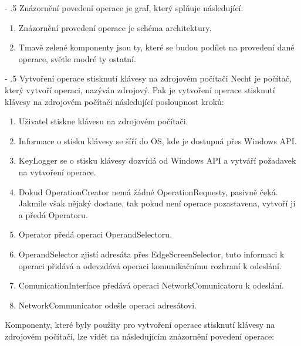 \documentclass[12pt]{article}
\makeatletter
\renewcommand\paragraph{%
    \@startsection{paragraph}{4}{0mm}%
       {-\baselineskip}%
       {.5\baselineskip}%
       {\normalfont\normalsize\bfseries}}
\makeatother
\begin{document}
\paragraph{Znázornění povedení operace}
je graf, který splňuje následující:
\begin{enumerate}[leftmargin=5mm]
\item Znázornění provedení operace je schéma architektury.
\item Tmavě zelené komponenty jsou ty, které se budou podílet na provedení dané operace, světle modré ty ostatní.
\end{enumerate}

\paragraph{Vytvoření operace stisknutí klávesy na zdrojovém počítači}
Nechť je počítač, který vytvoří operaci, nazýván zdrojový. Pak je vytvoření operace stisknutí klávesy na zdrojovém počítači následující posloupnost kroků:
\begin{enumerate}[leftmargin=5mm]
\item Uživatel stiskne klávesu na zdrojovém počítači.
\item Informace o stisku klávesy se šíří do OS, kde je dostupná přes Windows API.
\item KeyLogger se o stisku klávesy dozvídá od Windows API a vytváří požadavek na vytvoření operace. 
\item Dokud OperationCreator nemá žádné OperationRequesty, pasivně čeká. Jakmile však nějaký dostane, tak pokud není operace pozastavena, vytvoří ji a předá Operatoru.
\item Operator předá operaci OperandSelectoru.
\item OperandSelector zjistí adresáta přes EdgeScreenSelector, tuto informaci k operaci přidává a odevzdává operaci komunikačnímu rozhraní k odeslání.
\item ComunicationInterface předává operaci NetworkComunicatoru k odeslání.
\item NetworkCommunicator odešle operaci adresátovi. 
\end{enumerate}
Komponenty, které byly použity pro vytvoření operace stisknutí klávesy na zdrojovém počítači, lze vidět na následujícím znázornění povedení operace:
\end{document}
